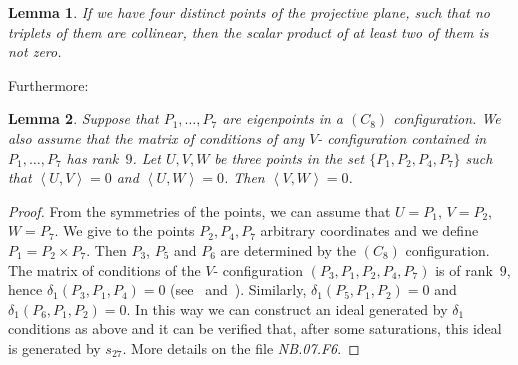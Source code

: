 \documentclass[a4paper, 11pt, reqno]{amsart}
\theoremstyle{plain}
\newtheorem{lemma}{Lemma}[section]
\theoremstyle{definition}
\newcommand{\nb}[2]{\textsl{{NB}.{#1}.{#2}}}
\newcommand{\scl}[2]{\left\langle {#1}, {#2} \right\rangle}
\begin{document}
\begin{lemma}
\label{lemma:6ortog} If we have four distinct points of the projective
plane, such that no triplets of them are collinear, then the scalar 
product of at least two of them is not zero.
\end{lemma}

Furthermore:

\begin{lemma}
\label{lemma:three_s_zero}
Suppose that $P_1, \dotsc, P_7$ are eigenpoints in a $(C_8)$ configuration.
We also assume that the matrix of conditions of any $V$- configuration contained in $P_1, \dotsc, P_7$ has rank~$9$. 
Let $U, V, W$ be three points in the set $\{P_1, P_2, P_4, P_7\}$
such that $\scl{U}{V} = 0$ and $\scl{U}{W} = 0$.
Then $\scl{V}{W} = 0$.
\end{lemma}
\begin{proof}
From the symmetries of the points, we can assume that $U=P_1$, $V=P_2$, $W=P_7$.
We give to the points $P_2, P_4, P_7$ arbitrary coordinates and 
we define $P_1 = P_2 \times P_7$. Then $P_3$, $P_5$ and $P_6$
are determined by the $(C_8)$ configuration. The matrix of conditions of the $V$- configuration 
$(P_3, P_1, P_2, P_4, P_7)$ 
is of rank~$9$, hence $\delta_1(P_3, P_1, P_4) = 0$ 
(see~ and~). 
Similarly, $\delta_1(P_5, P_1, P_2) = 0$ and $\delta_1(P_6, P_1, P_2) = 0$. In this way we can construct an ideal generated by 
$\delta_1$ conditions as above and it can be verified that, 
after some saturations, this ideal is generated by $s_{27}$.
More details on the file \nb{07}{F6}.
\end{proof}
\end{document}
